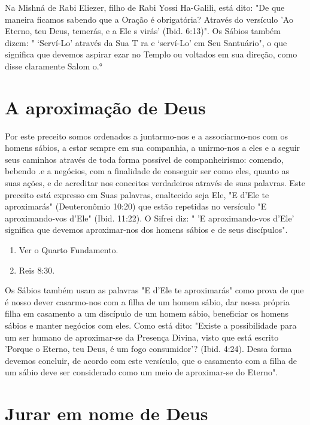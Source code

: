 \begin{itemize}
\begin{enumrate}
\begin{itemize}
Na Mishná de Rabi Eliezer, filho de Rabi Yossi Ha-Galili, está dito: "De
que maneira ficamos sabendo que a Oração é obrigatória? Através do
ver­sículo 'Ao Eterno, teu Deus, temerás, e a Ele s virás' (Ibid.
6:13)". Os Sábios também dizem: " `Serví-Lo' através da Sua T ra e
`serví-Lo' em Seu Santuá­rio", o que significa que devemos aspirar ezar
no Templo ou voltados em sua direção, como disse claramente Salom
o.°

\section{A aproximação de Deus}

Por este preceito somos ordenados a juntarmo-nos e a associarmo-nos com
os homens sábios, a estar sempre em sua companhia, a unirmo-nos a eles e
a seguir seus caminhos através de toda forma possível de
companheiris­mo: comendo, bebendo .e a negócios, com a finalidade de
conseguir ser como eles, quanto as suas ações, e de acreditar nos
conceitos verdadeiros através de suas palavras. Este preceito está
expresso em Suas palavras, enaltecido seja Ele, "E d'Ele te aproximarás"
(Deuteronômio 10:20) que estão repetidas no versí­culo "E
aproximando-vos d'Ele" (Ibid. 11:22). O Sifrei diz: " 'E aproximando-vos
d'Ele' significa que devemos aproximar-nos dos homens sábios e de seus
discípulos".


\begin{enumerate}
\def\labelenumi{\arabic{enumi}.}
\setcounter{enumi}{28}
\item
 
 Ver o Quarto Fundamento.
 
\item
 
 Reis 8:30.
 
\end{enumerate}

Os Sábios também usam as palavras "E d'Ele te aproximarás" como prova de
que é nosso dever casarmo-nos com a filha de um homem sábio, dar nossa
própria filha em casamento a um discípulo de um homem sábio, benefi­ciar
os homens sábios e manter negócios com eles. Como está dito: "Existe a
possibilidade para um ser humano de aproximar-se da Presença Divina,
visto que está escrito 'Porque o Eterno, teu Deus, é um fogo
consumidor'? (Ibid. 4:24). Dessa forma devemos concluir, de acordo com
este versículo, que o casamen­to com a filha de um sábio deve ser
considerado como um meio de aproximar-se do Eterno".


\section{Jurar em nome de Deus}



\end{itemize}
\end{enumrate}
\end{itemize}
